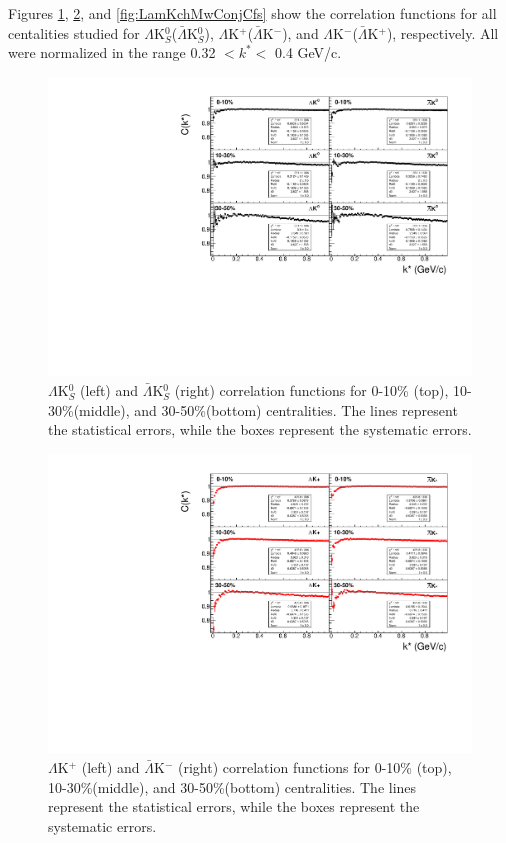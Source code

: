 \documentclass[../AnalysisNoteJBuxton.tex]{subfiles}
\begin{document}
Figures \ref{fig:cLamK0Cfs}, \ref{fig:LamKchPwConjCfs}, and \ref{fig:LamKchMwConjCfs} show the correlation functions for all centalities studied for $\Lambda$K$^{0}_{S}$($\bar{\Lambda}$K$^{0}_{S}$), $\Lambda$K$^{+}$($\bar{\Lambda}$K$^{-}$), and $\Lambda$K$^{-}$($\bar{\Lambda}$K$^{+}$), respectively. All were normalized in the range 0.32 $< k^{*} < $ 0.4 GeV/c.

\begin{figure}[h]
  \centering
  \includegraphics[width=\textwidth]{4_CorrelationFunctions/Figures/canKStarCfsLamK0wConj.pdf}
  \caption[$\Lambda$($\bar{\Lambda}$)K$^{0}_{S}$ Correlation Functions]{$\Lambda$K$^{0}_{S}$ (left) and $\bar{\Lambda}$K$^{0}_{S}$ (right) correlation functions for 0-10\% (top), 10-30\%(middle), and 30-50\%(bottom) centralities.  The lines represent the statistical errors, while the boxes represent the systematic errors.}
  \label{fig:cLamK0Cfs}
\end{figure}

\begin{figure}[h]
  \centering
  \includegraphics[width=\textwidth]{4_CorrelationFunctions/Figures/canKStarCfsLamKchPwConj.pdf}
  \caption[$\Lambda$K$^{+}$ and $\bar{\Lambda}$K$^{-}$ Correlation Functions]{$\Lambda$K$^{+}$ (left) and $\bar{\Lambda}$K$^{-}$ (right) correlation functions for 0-10\% (top), 10-30\%(middle), and 30-50\%(bottom) centralities.  The lines represent the statistical errors, while the boxes represent the systematic errors.}
  \label{fig:LamKchPwConjCfs}
\end{figure}
\end{document}
